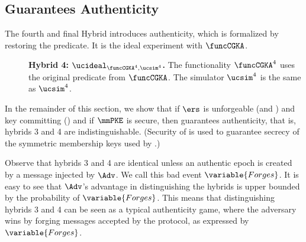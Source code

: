 \newcommand{\forges}{\variable{\small Forges}}
\newcommand{\forgesa}{\variable{\small ForgesAsym}}
\newcommand{\forgess}{\variable{\small ForgesSym}}
\subsection{\saik Guarantees Authenticity}\label{sec:protsec5}
The fourth and final Hybrid introduces authenticity, which is formalized by restoring the \KwAuth{} predicate. It is the ideal experiment with $\funcCGKA$.
\begin{description}
\item[] {\bf Hybrid 4: $\ucideal_{\funcCGKA^4, \ucsim^4}$.} The functionality $\funcCGKA^4$ uses the original \KwAuth{} predicate from $\funcCGKA$. The simulator $\ucsim^4$ is the same as $\ucsim^4$.
\end{description}

In the remainder of this section, we show that if $\ers$ is unforgeable (\shrsufcma and \ahrsufcma) and key committing (\rkc) and if $\mmPKE$ is \mmowrcca secure, then \saik guarantees authenticity, that is, hybrids 3 and 4 are indistinguishable. (Security of \mmPKE is used to guarantee secrecy of the symmetric membership keys used by \ers.)

Observe that hybrids 3 and 4 are identical unless an authentic epoch is created by a message injected by $\Adv$. We call this bad event $\forges$. It is easy to see that $\Adv$'s advantage in distinguishing the hybrids is upper bounded by the probability of $\forges$. This means that distinguishing hybrids 3 and 4 can be seen as a typical authenticity game, where the adversary wins by forging messages accepted by the protocol, as expressed by $\forges$.


